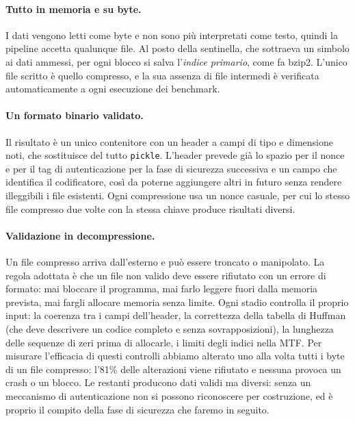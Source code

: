 \documentclass[11pt,a4paper]{article}
\begin{document}
\paragraph{Tutto in memoria e su byte.} I dati vengono letti come byte e non sono più
interpretati come testo, quindi la pipeline accetta qualunque file. Al posto della
sentinella, che sottraeva un simbolo ai dati ammessi, per ogni blocco si salva l'\emph{indice
primario}, come fa bzip2. L'unico file scritto è quello compresso, e la sua assenza di file
intermedi è verificata automaticamente a ogni esecuzione dei benchmark.

\paragraph{Un formato binario validato.} Il risultato è un unico contenitore con un header a
campi di tipo e dimensione noti, che sostituisce del tutto \texttt{pickle}. L'header prevede
già lo spazio per il nonce e per il tag di autenticazione per la fase di sicurezza successiva e un campo che
identifica il codificatore, così da poterne aggiungere altri in futuro senza rendere
illeggibili i file esistenti. Ogni compressione usa un nonce casuale, per cui lo stesso
file compresso due volte con la stessa chiave produce risultati diversi.

\paragraph{Validazione in decompressione.} Un file compresso arriva dall'esterno e può essere
troncato o manipolato. La regola adottata è che un file non valido deve essere rifiutato
con un errore di formato: mai bloccare il programma, mai farlo leggere fuori dalla memoria
prevista, mai fargli allocare memoria senza limite. Ogni stadio controlla il proprio input:
la coerenza tra i campi dell'header, la correttezza della tabella di Huffman (che deve
descrivere un codice completo e senza sovrapposizioni), la lunghezza delle sequenze di zeri
prima di allocarle, i limiti degli indici nella MTF. Per misurare l'efficacia di questi
controlli abbiamo alterato uno alla volta tutti i byte di un file compresso: l'81\% delle
alterazioni viene rifiutato e nessuna provoca un crash o un blocco. Le restanti producono
dati validi ma diversi: senza un meccanismo di autenticazione non si possono riconoscere per
costruzione, ed è proprio il compito della fase di sicurezza che faremo in seguito.
\end{document}
